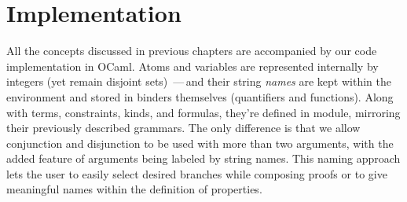 \documentclass[english, mgr]{iithesis}
\newcommand{\lstt}[1]{\text{{\lstinline[columns=fixed,mathescape]|#1|}}}
\renewcommand{\it}[1]{\textit{#1}}
\newcommand{\fix}[3]{\ensuremath{\text{fix }#1(#2)\ofkind#3=}}\newcommand{\myatop}[2]{\ensuremath{\genfrac{}{}{0pt}{}{#1\hfill}{#2\hfill}}}
\newcommand{\mdash}{\,---\,}
\def\-{{\mdash}}
\begin{document}

\chapter{Implementation}
All the concepts discussed in previous chapters are accompanied by our code implementation in OCaml.
Atoms and variables are represented internally by integers (yet remain disjoint sets)
\-and their string \it{names} are kept within the environment and
stored in binders themselves (quantifiers and functions).
Along with terms, constraints, kinds, and formulas, they're defined in \lstt{Types} module,
mirroring their previously described grammars.
The only difference is that we allow conjunction and disjunction to be used with
more than two arguments, with the added feature of arguments being labeled by string names.
This naming approach lets the user to easily select desired branches while composing proofs
or to give meaningful names within the definition of properties.
\end{document}
